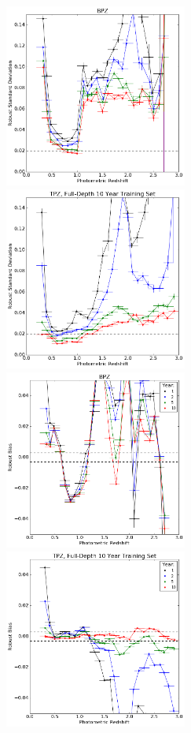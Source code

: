\documentclass[DM,lsstdraft,toc]{lsstdoc}
\begin{document}
\begin{figure}
\begin{center}
\includegraphics[width=6cm]{figures/BPZ_Euclid_IQRs.png}
\includegraphics[width=6cm]{figures/TPZ_Euclid_TFD_IQRs.png}
\includegraphics[width=6cm]{figures/BPZ_Euclid_bias.png}
\includegraphics[width=6cm]{figures/TPZ_Euclid_TFD_bias.png}

\end{center}
\end{figure}
\end{document}
